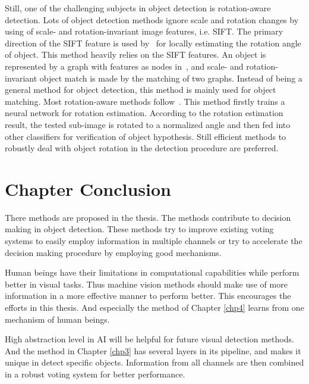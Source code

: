 Still, one of the challenging subjects in object detection is rotation-aware detection. Lots of object detection methods ignore scale and rotation changes by using of scale- and rotation-invariant image features, i.e. SIFT.
The primary  direction of the SIFT feature is used by~\citep{ac21} for locally estimating the rotation angle of object. This method heavily relies on the SIFT features.
An object is represented by a graph with features as nodes in~\citep{ac222}, and scale- and rotation-invariant object match is made by the matching of two graphs. Instead of being a general method for object detection, this method is mainly used for object matching.
Most rotation-aware methods follow~\citep{ac20}. This method firstly trains a neural network for rotation estimation. According to the rotation estimation result, the tested sub-image is rotated to a normalized angle and then fed into other classifiers for verification of object hypothesis. Still efficient methods to robustly deal with object rotation in the detection procedure are preferred.

\section{Chapter Conclusion}
\label{ch2p5}
There methods are proposed in the thesis. The methods contribute to decision making in object detection. These methods try to improve existing voting systems to easily employ information in multiple channels or try to accelerate the decision making procedure by employing good mechanisms.

Human beings have their limitations in computational capabilities while perform better in visual tasks. Thus machine vision methods should make use of more information in a more effective manner to perform better. This encourages the efforts in this thesis. And especially the method of Chapter \ref{chp4} learns from one mechanism of human beings.

High abstraction level in AI will be helpful for future visual detection methods. And the method in Chapter \ref{chp3} has several layers in its pipeline, and makes it unique in detect specific objects. Information from all channels are then combined in a robust voting system for better performance.

